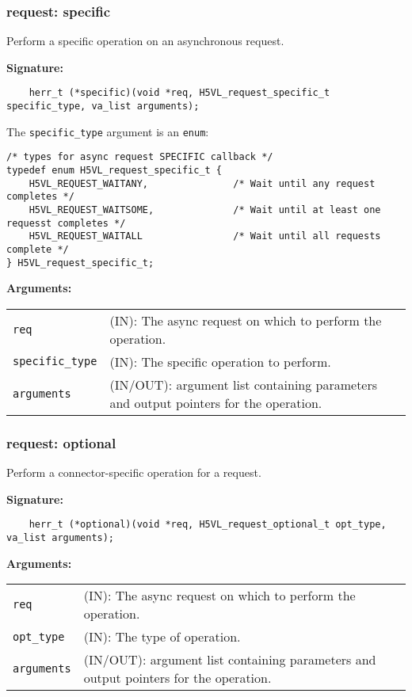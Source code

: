 \subsubsection{request: specific}
Perform a specific operation on an asynchronous request.

\begin{mdframed}[style=bgbox]
\textbf{Signature:}
\begin{lstlisting}
    herr_t (*specific)(void *req, H5VL_request_specific_t specific_type, va_list arguments);
\end{lstlisting}

The \texttt{specific\_type} argument is an \texttt{enum}:
\begin{lstlisting}
/* types for async request SPECIFIC callback */
typedef enum H5VL_request_specific_t {
    H5VL_REQUEST_WAITANY,               /* Wait until any request completes */   
    H5VL_REQUEST_WAITSOME,              /* Wait until at least one requesst completes */
    H5VL_REQUEST_WAITALL                /* Wait until all requests complete */   
} H5VL_request_specific_t; 
\end{lstlisting}

\textbf{Arguments:}\\
\begin{tabular}{l p{13.5cm}}
  \texttt{req} & (IN): The async request on which to perform the operation.\\
  \texttt{specific\_type} & (IN): The specific operation to perform.\\
  \texttt{arguments} & (IN/OUT): argument list containing parameters and output pointers for the operation. \\
\end{tabular}
\end{mdframed}

\subsubsection{request: optional}
Perform a connector-specific operation for a request.

\begin{mdframed}[style=bgbox]
\textbf{Signature:}
\begin{lstlisting}
    herr_t (*optional)(void *req, H5VL_request_optional_t opt_type, va_list arguments);                            
\end{lstlisting}

\textbf{Arguments:}\\
\begin{tabular}{l p{13.5cm}}
  \texttt{req} & (IN): The async request on which to perform the operation.\\
  \texttt{opt\_type} & (IN): The type of operation.\\
  \texttt{arguments} & (IN/OUT): argument list containing parameters and output pointers for the operation. \\
\end{tabular}
\end{mdframed}

